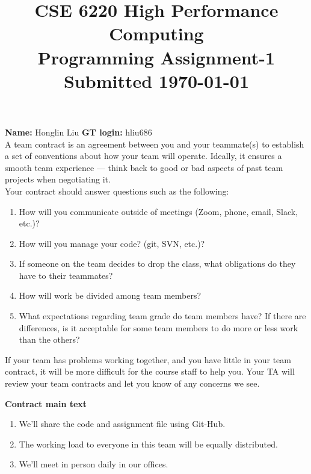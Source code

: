 \documentclass[11pt]{article}
\begin{document}
\title{\large\bf \vspace*{-0.3in}CSE 6220 High Performance Computing\\
Programming Assignment-1 \\Submitted \today}
\author{}
\date{}
\maketitle
\vspace*{-0.8in}
{\bf Name:} Honglin Liu \hfill{{\bf GT login:} hliu686}\\

A team contract is an agreement between you and your teammate(s) to establish a set of conventions about how your team will operate. 
Ideally, it ensures a smooth team experience — think back to good or bad aspects of past team projects when negotiating it.\\

Your contract should answer questions such as the following:
\begin{enumerate}
	\item How will you communicate outside of meetings (Zoom, phone, email, Slack, etc.)?
	\item How will you manage your code? (git, SVN, etc.)?
	\item If someone on the team decides to drop the class, what obligations do they have to their teammates?
	\item How will work be divided among team members?
	\item What expectations regarding team grade do team members have? If there are differences, is it acceptable for some team members to do more or less work than the others?
\end{enumerate}

If your team has problems working together, and you have little in your team contract, it will be more difficult for the course staff to help you. Your TA will review your team contracts and let you know of any concerns we see.


\newpage
\textbf{Contract main text}
\begin{enumerate}
	\item We'll share the code and assignment file using Git-Hub.
 	\item The working load to everyone in this team will be equally distributed.
  	\item We'll meet in person daily in our offices.
\end{enumerate}
\end{document}
